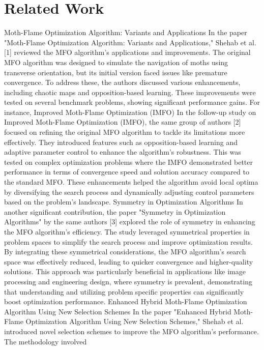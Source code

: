 \documentclass[conference]{IEEEtran}
\begin{document}
\section{Related Work}
Moth-Flame Optimization Algorithm: Variants and 
Applications
In the paper "Moth-Flame Optimization Algorithm: Variants 
and Applications," Shehab et al. [1] reviewed the MFO 
algorithm's applications and improvements. The original 
MFO algorithm was designed to simulate the navigation of 
moths using transverse orientation, but its initial version 
faced issues like premature convergence. To address these, 
the authors discussed various enhancements, including 
chaotic maps and opposition-based learning. These 
improvements were tested on several benchmark problems, 
showing significant performance gains. For instance, 
Improved Moth-Flame Optimization (IMFO)
In the follow-up study on Improved Moth-Flame 
Optimization (IMFO), the same group of authors [2] 
focused on refining the original MFO algorithm to tackle its 
limitations more effectively. They introduced features such 
as opposition-based learning and adaptive parameter control 
to enhance the algorithm's robustness. This was tested on 
complex optimization problems where the IMFO 
demonstrated better performance in terms of convergence 
speed and solution accuracy compared to the standard 
MFO. These enhancements helped the algorithm avoid local 
optima by diversifying the search process and dynamically 
adjusting control parameters based on the problem's 
landscape​​.
Symmetry in Optimization Algorithms
In another significant contribution, the paper "Symmetry in 
Optimization Algorithms" by the same authors [3] explored 
the role of symmetry in enhancing the MFO algorithm's 
efficiency. The study leveraged symmetrical properties in 
problem spaces to simplify the search process and improve 
optimization results. By integrating these symmetrical 
considerations, the MFO algorithm's search space was 
effectively reduced, leading to quicker convergence and 
higher-quality solutions. This approach was particularly 
beneficial in applications like image processing and 
engineering design, where symmetry is prevalent, 
demonstrating that understanding and utilizing problemspecific properties can significantly boost optimization 
performance​​.
Enhanced Hybrid Moth-Flame Optimization Algorithm 
Using New Selection Schemes
In the paper "Enhanced Hybrid Moth-Flame Optimization 
Algorithm Using New Selection Schemes," Shehab et al. 
introduced novel selection schemes to improve the MFO 
algorithm's performance. The methodology involved 
\end{document}
